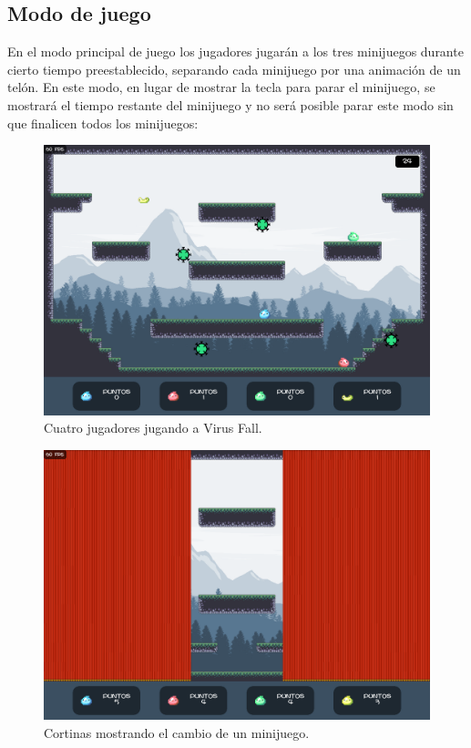 \documentclass[12pt, spanish]{article}
\begin{document}
\subsection{Modo de juego}

En el modo principal de juego los jugadores jugarán a los tres minijuegos durante cierto tiempo preestablecido, separando cada minijuego por una animación de un telón. En este modo, en lugar de mostrar la tecla para parar el minijuego, se mostrará el tiempo restante del minijuego y no será posible parar este modo sin que finalicen todos los minijuegos:

\begin{figure}[H]
	\centering
	\includegraphics[width=\textwidth]{"modos/virus_play_state.png"}
	\caption{Cuatro jugadores jugando a Virus Fall.}\label{figure:virus_play_state}
\end{figure}

\begin{figure}[H]
	\centering
	\includegraphics[width=\textwidth]{"modos/cortinas_cambio_minijuego.png"}
	\caption{Cortinas mostrando el cambio de un minijuego.}\label{figure:cortinas_cambio_minijuego}
\end{figure}
\end{document}
